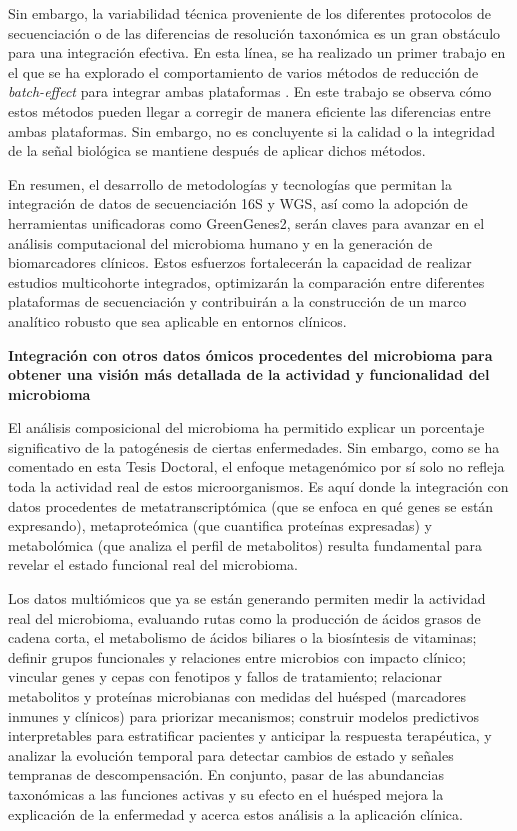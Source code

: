 Sin embargo, la variabilidad técnica proveniente de los diferentes protocolos de secuenciación o de las diferencias de resolución taxonómica es un gran obstáculo para una integración efectiva. En esta línea, se ha realizado un primer trabajo en el que se ha explorado el comportamiento de varios métodos de reducción de \textit{batch-effect} para integrar ambas plataformas \cite{fernandez2024cross}. En este trabajo se observa cómo estos métodos pueden llegar a corregir de manera eficiente las diferencias entre ambas plataformas. Sin embargo, no es concluyente si la calidad o la integridad de la señal biológica se mantiene después de aplicar dichos métodos.

En resumen, el desarrollo de metodologías y tecnologías que permitan la integración de datos de secuenciación 16S y WGS, así como la adopción de herramientas unificadoras como GreenGenes2, serán claves para avanzar en el análisis computacional del microbioma humano y en la generación de biomarcadores clínicos. Estos esfuerzos fortalecerán la capacidad de realizar estudios multicohorte integrados, optimizarán la comparación entre diferentes plataformas de secuenciación y contribuirán a la construcción de un marco analítico robusto que sea aplicable en entornos clínicos.


\textbf{Integración con otros datos ómicos procedentes del microbioma para obtener una visión más detallada de la actividad y funcionalidad del microbioma}


El análisis composicional del microbioma ha permitido explicar un porcentaje significativo de la patogénesis de ciertas enfermedades. Sin embargo, como se ha comentado en esta Tesis Doctoral, el enfoque metagenómico por sí solo no refleja toda la actividad real de estos microorganismos. Es aquí donde la integración con datos procedentes de metatranscriptómica (que se enfoca en qué genes se están expresando), metaproteómica (que cuantifica proteínas expresadas) y metabolómica (que analiza el perfil de metabolitos) resulta fundamental para revelar el estado funcional real del microbioma.

Los datos multiómicos que ya se están generando permiten medir la actividad real del microbioma, evaluando rutas como la producción de ácidos grasos de cadena corta, el metabolismo de ácidos biliares o la biosíntesis de vitaminas; definir grupos funcionales y relaciones entre microbios con impacto clínico; vincular genes y cepas con fenotipos y fallos de tratamiento; relacionar metabolitos y proteínas microbianas con medidas del huésped (marcadores inmunes y clínicos) para priorizar mecanismos; construir modelos predictivos interpretables para estratificar pacientes y anticipar la respuesta terapéutica, y analizar la evolución temporal para detectar cambios de estado y señales tempranas de descompensación. En conjunto, pasar de las abundancias taxonómicas a las funciones activas y su efecto en el huésped mejora la explicación de la enfermedad y acerca estos análisis a la aplicación clínica.

